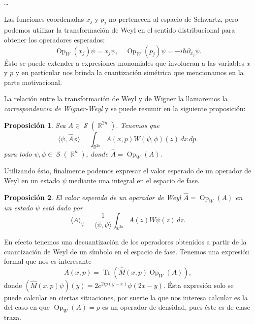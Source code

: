 \documentclass[a4paper]{report}
\DeclareMathOperator{\R}{\mathbb{R}}
\DeclareMathOperator{\Sz}{\mathcal S}
\DeclareMathOperator{\Tr}{Tr}
\DeclareMathOperator{\Op}{Op}
\newtheorem{proposition}{Proposición}
\begin{document}
  \ldots
  
  Las funciones coordenadas $x_j$ y $p_j$ no pertenecen al
  espacio de Schwartz, pero podemos utilizar la
  transformación de Weyl en el sentido distribucional para
  obtener los operadores esperados:
  \begin{equation}
    \Op_W(x_j)\psi = x_j\psi,
    \quad
    \Op_W(p_j)\psi = -i\hbar \partial_{x_j}\psi.
  \end{equation}
  Ésto se puede extender a expresiones monomiales que
  involucran a las variables $x$ y $p$ y en partícular nos
  brinda la cuantización simétrica que mencionamos en la
  parte motivacional.

  La relación entre la transformación de Weyl y
  de Wigner la llamaremos la \textit{correspondencia de
  Wigner-Weyl} y se puede resumir en la siguiente
  proposición:
  \begin{proposition}
    \label{prop:wigner-weyl}
    Sea $A \in \Sz(\R^{2n})$. Tenemos que
    \begin{equation}
      \langle \psi, \hat{A}\phi \rangle
      = \int_{\R^{2n}} A(x,p)W(\psi,\phi)(z) \, dx \, dp.
    \end{equation}
    para todo $\psi, \phi \in \Sz(\R^{n})$, donde $\hat{A} =
    \Op_W(A)$.
  \end{proposition}
  Utilizando ésto, finalmente podemos expresar el valor
  esperado de un operador de Weyl en un estado $\psi$
  mediante una integral en el espacio de fase.
  \begin{proposition}
    El valor esperado de un operador de Weyl $\hat{A} =
    \Op_W(A)$ en un estado $\psi$ está dado por
    \begin{equation}
      \langle \hat{A} \rangle_\psi
      = \frac{1}{\langle \psi, \psi \rangle} 
      \int_{\R^{2n}} A(z) W\psi(z) \, dz.
    \end{equation}
  \end{proposition}  
  En efecto tenemos una decuantización de los operadores
  obtenidos a partir de la cuantización de Weyl de un
  símbolo en el espacio de fase. Tenemos una expresión
  formal que nos es interesante
  \begin{equation}
    A(x,p) = \Tr\left( \hat{M}(x,p) \Op_W(A) \right),
  \end{equation}
  donde $(\hat{M}(x,p)\psi)(y) = 2e^{2i p (y - x)}\psi(2x -
  y)$. Ésta expresión solo se puede calcular en ciertas
  situaciones, por suerte la que nos interesa calcular es la
  del caso en que $\Op_W(A) = \rho$ es un operador de
  densidad, pues éste es de clase traza.
\end{document}
